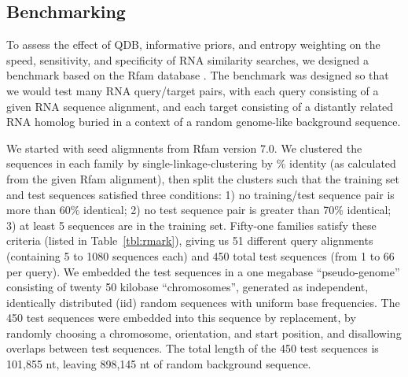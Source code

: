 \documentclass[11pt]{article}
\newif\ifdraft
\begin{document}
\subsection{Benchmarking}

To assess the effect of QDB, informative priors, and entropy weighting
on the speed, sensitivity, and specificity of RNA similarity searches,
we designed a benchmark based on the Rfam database
\cite{Griffiths-Jones05}. The benchmark was designed so that we would
test many RNA query/target pairs, with each query consisting of a
given RNA sequence alignment, and each target consisting of a
distantly related RNA homolog buried in a context of a random
genome-like background sequence.

We started with seed aligmnents from Rfam version 7.0. We clustered
the sequences in each family by single-linkage-clustering by \%
identity (as calculated from the given Rfam alignment), then split the
clusters such that the training set and test sequences satisfied three
conditions: 1) no training/test sequence pair is more than 60\%
identical; 2) no test sequence pair is greater than 70\% identical; 3)
at least 5 sequences are in the training set.  Fifty-one families
satisfy these criteria (listed in Table~\ref{tbl:rmark}), giving us 51
different query alignments (containing 5 to 1080 sequences each) and
450 total test sequences (from 1 to 66 per query).  We embedded the
test sequences in a one megabase ``pseudo-genome'' consisting of
twenty 50 kilobase ``chromosomes'', generated as independent,
identically distributed (iid) random sequences with uniform base
frequencies.  The 450 test sequences were embedded into this sequence
by replacement, by randomly choosing a chromosome, orientation, and
start position, and disallowing overlaps between test sequences. The
total length of the 450 test sequences is 101,855 nt, leaving 898,145
nt of random background sequence.

\ifdraft

\fi
\end{document}
